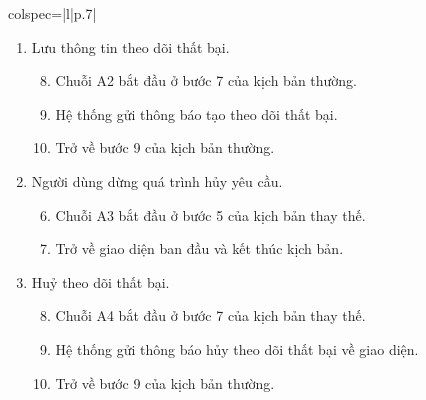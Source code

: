 \documentclass{article}
\begin{document}
\begin{longtblr}[caption = {Đặc tả usecase 	Theo dõi trận đấu, giải đấu},
  label = {tab:usecase1-spec},]{colspec={|l|p{.7\linewidth}|}}
\begin{minipage}{\linewidth}
\begin{enumerate}[label={\textbf{\textcolor{red}{A\arabic*}} --}, align=left, itemsep=-5pt]
       \item Lưu thông tin theo dõi thất bại. \\
            \vspace{-1.5em}
            \begin{enumerate}[leftmargin=-5px, align=left, label=\arabic*.]
              \setcounter{enumii}{7}
              \item[]
                    \hspace{-25px} 	Chuỗi A2 bắt đầu ở bước 7 của kịch bản thường.
              \item Hệ thống gửi thông báo tạo theo dõi thất bại.
              \item[]
                    \hspace{-25px} Trở về bước 9 của kịch bản thường.
            \end{enumerate}
            
         \item Người dùng dừng quá trình hủy yêu cầu. \\
            \vspace{-1.5em}
            \begin{enumerate}[leftmargin=-5px, align=left, label=\arabic*.]
              \setcounter{enumii}{5}
              \item[]
                    \hspace{-25px} 	Chuỗi A3 bắt đầu ở bước 5 của kịch bản thay thế.
              \item Trở về giao diện ban đầu và kết thúc kịch bản.
            \end{enumerate}

        \item Huỷ theo dõi thất bại. \\
            \vspace{-1.5em}
            \begin{enumerate}[leftmargin=-5px, align=left, label=\arabic*.]
              \setcounter{enumii}{7}
              \item[]
                    \hspace{-25px} 	Chuỗi A4 bắt đầu ở bước 7 của kịch bản thay thế.
              \item Hệ thống gửi thông báo hủy theo dõi thất bại về giao diện.
              \item[]
                    \hspace{-25px} Trở về bước 9 của kịch bản thường.
            \end{enumerate}
            

\end{enumerate}
\end{minipage}
\end{longtblr}
\end{document}
